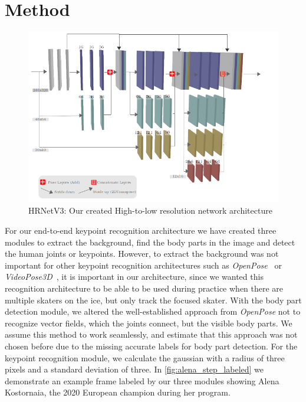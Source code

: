 

\chapter{Method} %

\label{method} %


\vspace*{\fill}
\begin{figure}[th]
    \centering
    \includegraphics[width=150mm]{Figures/custom_hrnet_lines.png}
    \decoRule
    \caption[HRNetV3: Our HRNet Architecture]{HRNetV3: Our created High-to-low resolution network architecture}
    \label{fig:custom_hrnet}
\end{figure}
For our end-to-end keypoint recognition architecture we have created three modules to extract the background,
find the body parts in the image and detect the human joints or keypoints.
However, to extract the background was not important for other keypoint recognition architectures such as
\textit{OpenPose}~\cite{openpose} or \textit{VideoPose3D}~\cite{videopose3d}, it is important in our architecture, since we wanted
this recognition architecture to be able to be used during practice when there are multiple skaters on the ice,
but only track the focused skater.
With the body part detection module, we altered the well-established approach from \textit{OpenPose} not to recognize vector
fields, which the joints connect, but the visible body parts.
We assume this method to work seamlessly, and estimate that this approach was not chosen before due to the missing
accurate labels for body part detection.
For the keypoint recognition module, we calculate the gaussian with a radius of three pixels and a standard deviation of
three.
In \autoref{fig:alena_step_labeled} we demonstrate an example frame labeled by our three modules
showing Alena Kostornaia, the 2020 European champion during her program.

